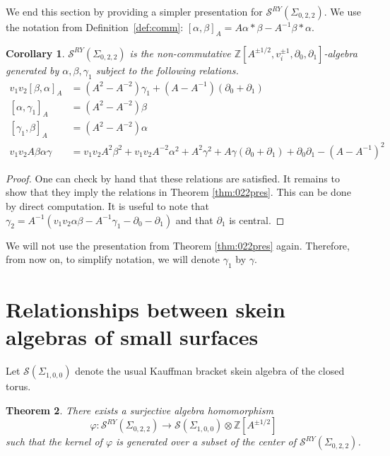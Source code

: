 \documentclass{article}
\newcommand{\del}{\partial}
\newcommand{\Z}{\mathbb{Z}}
\renewcommand{\phi}{\varphi}
\renewcommand{\a}{\alpha}
\renewcommand{\b}{\beta}
\newcommand{\g}{\gamma}
\renewcommand{\S}{\mathcal{S}}
\newcommand{\SRY}{\mathcal{S}^{RY}}
\newcommand{\san}{\Sigma_{0,2,2}}
\newtheorem{theorem}{Theorem}[section]
\newtheorem{corollary}[theorem]{Corollary}
\theoremstyle{definition}
\renewcommand{\g}{\gamma}
\renewcommand{\a}{\alpha}
\renewcommand{\b}{\beta}
\renewcommand{\san}{\Sigma_{0, 2, 2}}
\renewcommand{\SRY}{\ensuremath{ \mathcal S^{RY}}}
\begin{document}
 
 
We end this section by providing a simpler presentation for $\S^{RY}(\Sigma_{0,2,2})$.   We use the notation from  Definition~\ref{def:comm}:  $[\alpha, \beta]_A = A \alpha * \beta - A^{-1} \beta * \alpha$. 






\begin{corollary}\label{cor:real022pres}
    $\S^{RY}(\Sigma_{0,2,2})$ is the non-commutative $\Z[A^{\pm 1/2},v_i^{\pm1},\del_0,\del_1]$-algebra generated by $\a,\b,\g_1$ subject to the following relations. 
    \begin{align}
        v_1v_2[\b,\a]_A&=(A^{2}-A^{-2})\g_1+(A-A^{-1})(\del_0+\del_1)\label{eqn:tor1}\\
        [\a,\g_1]_A&=(A^2-A^{-2})\b\label{eqn:tor2}\\
        [\g_1,\b]_A&=(A^2-A^{-2})\a\label{eqn:tor3}\\
        v_1v_2A\b\a\g&=v_1v_2A^2\b^2+v_1v_2A^{-2}\a^2+A^2\g^2+A\g(\del_0+\del_1)+\del_0\del_1-(A-A^{-1})^2\label{eqn:tor4}
    \end{align}
\end{corollary}




\begin{proof}
    One can check by hand that these relations are satisfied. It remains to show that they imply the relations in Theorem \ref{thm:022pres}. This can be done by direct computation. It is useful to note that $\g_2=A^{-1}(v_1v_2\a\b-A^{-1}\g_1-\del_0-\del_1)$ and that $\del_1$ is central.
\end{proof}

We will not use the presentation from Theorem \ref{thm:022pres} again. Therefore, from now on, to simplify notation, we will denote $\gamma_1$ by $\gamma$. 

\section{Relationships between skein algebras of small surfaces} \label{sec:relationships}


Let  $\mathcal{S}(\Sigma_{1,0,0})$ denote the usual Kauffman bracket skein algebra of the closed torus.  


\begin{theorem}\label{thm:hom-to-torus}
    There exists a surjective algebra homomorphism
    \[
    \phi:\S^{RY}(\Sigma_{0,2,2})\to  \mathcal{S}(\Sigma_{1,0,0})\otimes \Z[A^{\pm 1/2}]
    \]
such that the kernel of $\phi$ is generated over a subset of the center of $\SRY(\san)$.
\end{theorem}
\end{document}
